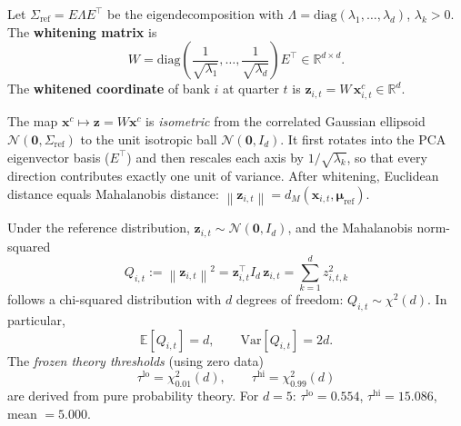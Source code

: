\documentclass[journal]{IEEEtran}
\newcommand{\R}{\mathbb{R}}
\newcommand{\E}{\mathbb{E}}
\newcommand{\norm}[1]{\left\lVert#1\right\rVert}
\begin{document}
\begin{definition}
\label{def:whiten}
Let $\Sigma_{\mathrm{ref}} = E \Lambda E^\top$ be the eigendecomposition with
$\Lambda = \mathrm{diag}(\lambda_1,\ldots,\lambda_d)$, $\lambda_k > 0$.
The \textbf{whitening matrix} is
\begin{equation}
  W = \mathrm{diag}\!\left(\frac{1}{\sqrt{\lambda_1}},\ldots,
      \frac{1}{\sqrt{\lambda_d}}\right) E^\top \in \R^{d\times d}.
  \label{eq:W}
\end{equation}
The \textbf{whitened coordinate} of bank $i$ at quarter $t$ is
$\mathbf{z}_{i,t} = W\,\mathbf{x}^c_{i,t} \in \R^d$.
\end{definition}

\begin{remark}
The map $\mathbf{x}^c \mapsto \mathbf{z} = W\mathbf{x}^c$ is \emph{isometric}
from the correlated Gaussian ellipsoid $\mathcal{N}(\mathbf{0},\Sigma_{\mathrm{ref}})$
to the unit isotropic ball $\mathcal{N}(\mathbf{0},I_d)$.  It first rotates
into the PCA eigenvector basis ($E^\top$) and then rescales each axis by
$1/\sqrt{\lambda_k}$, so that every direction contributes exactly one unit
of variance.  After whitening, Euclidean distance equals Mahalanobis distance:
$\norm{\mathbf{z}_{i,t}} = d_M(\mathbf{x}_{i,t},\boldsymbol{\mu}_{\mathrm{ref}})$.
\end{remark}

\begin{theorem}
\label{thm:chi2}
Under the reference distribution, $\mathbf{z}_{i,t} \sim \mathcal{N}(\mathbf{0},I_d)$,
and the Mahalanobis norm-squared
\begin{equation}
  Q_{i,t} := \norm{\mathbf{z}_{i,t}}^2
           = \mathbf{z}_{i,t}^\top I_d\, \mathbf{z}_{i,t}
           = \sum_{k=1}^{d} z_{i,t,k}^2
  \label{eq:Qdef}
\end{equation}
follows a chi-squared distribution with $d$ degrees of freedom:
$Q_{i,t} \sim \chi^2(d)$.  In particular,
\[
  \E[Q_{i,t}] = d, \qquad
  \mathrm{Var}[Q_{i,t}] = 2d.
\]
The \emph{frozen theory thresholds} (using zero data)
\begin{equation}
  \tau^{\mathrm{lo}} = \chi^2_{0.01}(d), \qquad
  \tau^{\mathrm{hi}} = \chi^2_{0.99}(d)
  \label{eq:tau_chi2}
\end{equation}
are derived from pure probability theory.  For $d=5$: $\tau^{\mathrm{lo}}=0.554$,
$\tau^{\mathrm{hi}}=15.086$, mean $= 5.000$.
\end{theorem}
\end{document}
